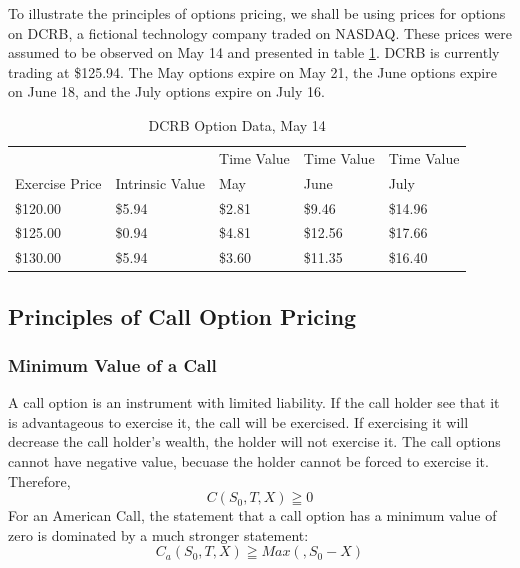 \documentclass{book}
\theoremstyle{definition}
\theoremstyle{remark}
\begin{document}
        To illustrate the principles of options pricing, we shall be using prices for options on DCRB, a fictional technology company traded on NASDAQ. These prices were assumed to be observed on May 14 and presented in table \ref{tab:montage}. DCRB is currently trading at \$125.94. The May options expire on May 21, the June options expire on June 18, and the July options expire on July 16.
        

            \begin{table}[h]
                \centering
                \caption{DCRB Option Data, May 14}
                \label{tab:montage}
                \begin{tabular}[h]{lllll}
                    \toprule
                    & & Time Value & Time Value & Time Value \\
                    Exercise Price & Intrinsic Value & May & June & July \\
                    \midrule
                    \$120.00 & \$5.94 & \$2.81 & \$9.46 & \$14.96 \\
                    \$125.00 & \$0.94 & \$4.81 & \$12.56 & \$17.66 \\
                    \$130.00 & \$5.94 & \$3.60 & \$11.35 & \$16.40 \\
                    \bottomrule
                \end{tabular}     
            \end{table}
    
    \newpage
    \subsection{Principles of Call Option Pricing}
        \subsubsection{Minimum Value of a Call}
            A call option is an instrument with limited liability. If the call holder see that it is advantageous to exercise it, the call will be exercised. If exercising it will decrease the call holder's wealth, the holder will not exercise it. The call options cannot have negative value, becuase the holder cannot be forced to exercise it. Therefore, 
                \begin{equation}
                    C(S_0, T, X) \geqq 0
                \end{equation}
            For an American Call, the statement that a call option has a minimum value of zero is dominated by a much stronger statement: 
                \begin{equation}
                    C_a(S_0, T, X) \geqq Max(, S_0 - X)
                \end{equation}
            
\end{document}
